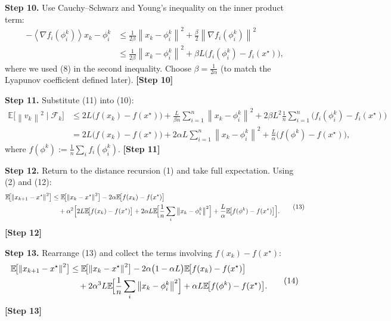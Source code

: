 \documentclass{article}
\newcommand{\E}{\mathbb{E}}
\newcommand{\norm}[1]{\left\|#1\right\|}
\newcommand{\inner}[1]{\left\langle #1 \right\rangle}
\begin{document}
\noindent\textbf{Step 10.}  Use Cauchy–Schwarz and Young’s inequality on the inner product term:
\[
\begin{aligned}
-\inner{\nabla f_i(\phi_i^k)}{x_k-\phi_i^k}
&\le \frac{1}{2\beta}\norm{x_k-\phi_i^k}^2+\frac{\beta}{2}\norm{\nabla f_i(\phi_i^k)}^2\\
&\le \frac{1}{2\beta}\norm{x_k-\phi_i^k}^2+\beta L\bigl(f_i(\phi_i^k)-f_i(x^\star)\bigr),
\end{aligned}
\tag{11}
\]
where we used (8) in the second inequality. Choose $\beta=\frac{1}{2\alpha}$ (to match the Lyapunov coefficient defined later). \textbf{[Step 10]}

\noindent\textbf{Step 11.}  Substitute (11) into (10):
\[
\begin{aligned}
\E\!\bigl[\norm{v_k}^2\mid\mathcal{F}_k\bigr]
&\le 2L\bigl(f(x_k)-f(x^\star)\bigr)
   +\frac{L}{\beta n}\sum_{i=1}^{n}\norm{x_k-\phi_i^k}^2
   +2\beta L^2\frac{1}{n}\sum_{i=1}^{n}\bigl(f_i(\phi_i^k)-f_i(x^\star)\bigr)\\
&= 2L\bigl(f(x_k)-f(x^\star)\bigr)
   +2\alpha L\sum_{i=1}^{n}\norm{x_k-\phi_i^k}^2
   +\frac{L}{\alpha}\bigl(f(\phi^k)-f(x^\star)\bigr),
\end{aligned}
\tag{12}
\]
where $f(\phi^k):=\frac{1}{n}\sum_i f_i(\phi_i^k)$. \textbf{[Step 11]}

\noindent\textbf{Step 12.}  Return to the distance recursion (1) and take full expectation.
Using (2) and (12):
\[
\begin{aligned}
\E\!\bigl[\norm{x_{k+1}-x^\star}^2\bigr]
&\le \E\!\bigl[\norm{x_k-x^\star}^2\bigr]
   -2\alpha\E\!\bigl[f(x_k)-f(x^\star)\bigr]\\
&\quad +\alpha^2\Bigl[2L\E\!\bigl[f(x_k)-f(x^\star)\bigr]
   +2\alpha L\E\!\Bigl[\frac{1}{n}\sum_i\norm{x_k-\phi_i^k}^2\Bigr]
   +\frac{L}{\alpha}\E\!\bigl[f(\phi^k)-f(x^\star)\bigr]\Bigr].
\end{aligned}
\tag{13}
\]
\textbf{[Step 12]}

\noindent\textbf{Step 13.}  Rearrange (13) and collect the terms involving $f(x_k)-f(x^\star)$:
\[
\begin{aligned}
\E\!\bigl[\norm{x_{k+1}-x^\star}^2\bigr]
&\le \E\!\bigl[\norm{x_k-x^\star}^2\bigr]
   -2\alpha\bigl(1-\alpha L\bigr)\E\!\bigl[f(x_k)-f(x^\star)\bigr]\\
&\quad +2\alpha^3 L\E\!\Bigl[\frac{1}{n}\sum_i\norm{x_k-\phi_i^k}^2\Bigr]
   +\alpha L\E\!\bigl[f(\phi^k)-f(x^\star)\bigr].
\end{aligned}
\tag{14}
\]
\textbf{[Step 13]}
\end{document}
